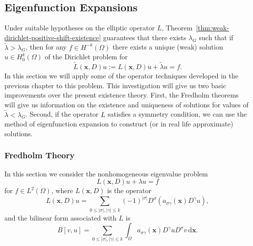 \subsection{Eigenfunction Expansions}\label{sec:elliptic-eigenfunction-expansions}

Under suitable hypotheses on the elliptic operator $L$, Theorem~\ref{thm:weak-dirichlet-positive-shift-existence} guarantees that there exists $\lambda_G$ such that if $\widetilde\lambda>\lambda_G$, then for any $f\in H^{-k}(\Omega)$ there exists a unique (weak) solution $u\in H_0^k(\Omega)$ of the Dirichlet problem for\[\widetilde L(\bm{x},D)u:=L(\bm{x},D)u+\widetilde\lambda u=f.\]In this section we will apply some of the operator techniques developed in the previous chapter to this problem. This investigation will give us two basic improvements over the present existence theory. First, the Fredholm theorems will give us information on the existence and uniqueness of solutions for values of $\widetilde\lambda<\lambda_G$. Second, if the operator $L$ satisfies a symmetry condition, we can use the method of eigenfunction expansion to construct (or in real life approximate) solutions.

\subsubsection{Fredholm Theory}\label{subsec:elliptic-fredholm-theory}

In this section we consider the nonhomogeneous eigenvalue problem
\begin{equation}\label{eq:elliptic-nonhomogeneous-shifted-eigenvalue-problem}
L(\bm{x},D)u+\lambda u=f
\end{equation}
for $f\in L^2(\Omega)$, where $L(\bm{x},D)$ is the operator\[L(\bm{x},D)u=\sum_{0\leq|\sigma|,|\gamma|\leq k}(-1)^{|\sigma|}D^\sigma(a_{\sigma\gamma}(\bm{x})D^\gamma u),\]and the bilinear form associated with $L$ is\[B[v,u]=\sum_{0\leq|\sigma|,|\gamma|\leq k}\int_\Omega a_{\sigma\gamma}(\bm{x})D^\gamma uD^\sigma v\,\mathrm{d}\bm{x}.\]

